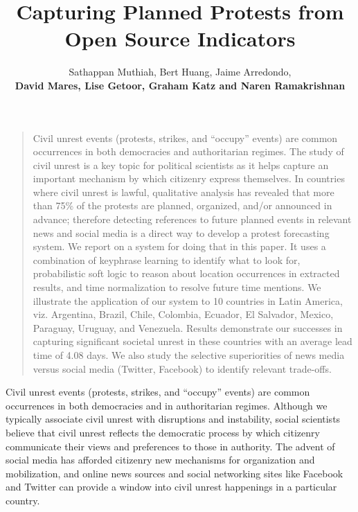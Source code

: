 \documentclass[letterpaper]{article}
\title{Capturing Planned Protests from Open Source Indicators}
\author{Sathappan Muthiah, Bert Huang, Jaime Arredondo,\\
{\bf \large David Mares, Lise Getoor, Graham Katz and Naren Ramakrishnan}}
\begin{document}
\newcommand{\then}{\Rightarrow}
\newcommand{\softor}{\operatornamewithlimits{{\vee}}}
\newcommand{\softand}{\operatornamewithlimits{{\wedge}}}
\newcommand{\softthen}{\operatornamewithlimits{{\then}}}
\newcommand{\softneg}{\operatornamewithlimits{{\neg}}}

\newtheorem{exmp}{Example}
\maketitle
\onecolumn


\begin{quote} %
Civil unrest events (protests, strikes, and ``occupy'' events) are common
occurrences in both democracies and authoritarian regimes. The study of civil
unrest is a key topic for political scientists as it helps capture an important
mechanism by which citizenry express themselves. In countries where civil
unrest is lawful, qualitative analysis has revealed that more than 75\% of the
protests are planned, organized, and/or announced in advance; therefore
detecting references to future planned events in relevant news and social media
is a direct way to develop a protest forecasting system. We report on a system
for doing that in this paper. It uses a combination of keyphrase learning to
identify what to look for, probabilistic soft logic to reason about location
occurrences in extracted results, and time normalization to resolve future time
mentions. We illustrate the application of our system to 10 countries in Latin
America, viz. Argentina, Brazil, Chile, Colombia, Ecuador, El Salvador, Mexico,
Paraguay, Uruguay, and Venezuela. Results demonstrate our successes in
capturing significant societal unrest in these countries with an average lead
time of 4.08 days. We also study the selective superiorities of news media
versus social media (Twitter, Facebook) to identify relevant trade-offs.
\end{quote}


Civil unrest events (protests, strikes, and ``occupy'' events) are
common occurrences in both democracies and in authoritarian regimes.
Although we typically associate civil unrest with disruptions and
instability, social scientists believe that civil unrest reflects the
democratic process by which citizenry communicate their views and
preferences to those in authority.  The advent of social media has
afforded citizenry new mechanisms for organization and mobilization, and
online news sources and social networking sites like Facebook and
Twitter can provide a window into civil unrest happenings in a
particular country.
\end{document}
